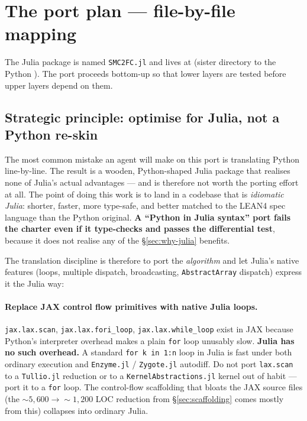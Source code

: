 \documentclass[11pt,a4paper]{article}
\begin{document}
\section{The port plan --- file-by-file mapping}
\label{sec:port-plan}

The Julia package is named \texttt{SMC2FC.jl} and lives at
 (sister directory
to the Python ). The port proceeds bottom-up so that
lower layers are tested before upper layers depend on them.

\subsection{Strategic principle: optimise for Julia, not a Python
re-skin}
\label{sec:port-principle}

The most common mistake an agent will make on this port is
translating Python line-by-line. The result is a wooden,
Python-shaped Julia package that realises none of Julia's actual
advantages --- and is therefore not worth the porting effort at
all. The point of doing this work is to land in a codebase that
is \emph{idiomatic Julia}: shorter, faster, more type-safe, and
better matched to the LEAN4 spec language than the Python
original. \textbf{A ``Python in Julia syntax'' port fails the
charter even if it type-checks and passes the differential test},
because it does not realise any of the §\ref{sec:why-julia}
benefits.

The translation discipline is therefore to port the
\emph{algorithm} and let Julia's native features (loops, multiple
dispatch, broadcasting, \texttt{AbstractArray} dispatch) express it
the Julia way:

\paragraph{Replace JAX control flow primitives with native Julia
loops.} \texttt{jax.lax.scan}, \texttt{jax.lax.fori\_loop},
\texttt{jax.lax.while\_loop} exist in JAX because Python's
interpreter overhead makes a plain \texttt{for} loop unusably slow.
\textbf{Julia has no such overhead.} A standard
\texttt{for k in 1:n} loop in Julia is fast under both ordinary
execution and \texttt{Enzyme.jl} / \texttt{Zygote.jl} autodiff. Do
not port \texttt{lax.scan} to a \texttt{Tullio.jl} reduction or to
a \texttt{KernelAbstractions.jl} kernel out of habit --- port it to
a \texttt{for} loop. The control-flow scaffolding that bloats the
JAX source files (the $\sim 5{,}600 \to \sim 1{,}200$ LOC reduction
from §\ref{sec:scaffolding} comes mostly from this) collapses into
ordinary Julia.
\end{document}
